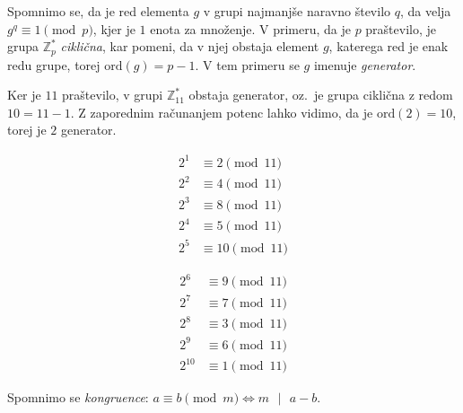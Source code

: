 \documentclass[isrm2, tisk]{fmfdelo}
\newcommand{\Z}{\mathbb Z}
\begin{document}
Spomnimo se, da je red elementa $g$ v grupi najmanjše naravno število $q$, da velja $g^q \equiv 1 \pmod p$, 
kjer je $1$ enota za množenje. V primeru, da je $p$ praštevilo, je grupa $\Z_p^*$ \textit{ciklična},
kar pomeni, da v njej obstaja element $g$, katerega red je enak redu grupe, torej $\text{ord}(g) = p - 1$.
V tem primeru se $g$ imenuje \textit{generator}.

\begin{primer}[Grupa $\Z_{11}^*$]
\label{primer:Z11}
Ker je $11$ praštevilo, v grupi $\Z_{11}^*$ obstaja generator, oz.\ je grupa ciklična z redom $10 = 
11 - 1$. Z zaporednim računanjem potenc lahko vidimo, da je $\text{ord}(2) = 10$, torej je $2$ 
generator.

\begin{minipage}{0.45\textwidth}
    \begin{align*}
        2^1 &\equiv 2 \pmod{11} \\
        2^2 &\equiv 4 \pmod{11} \\
        2^3 &\equiv 8 \pmod{11} \\
        2^4 &\equiv 5 \pmod{11} \\
        2^5 &\equiv 10 \pmod{11} 
    \end{align*}
\end{minipage}
\begin{minipage}{0.45\textwidth}
    \begin{align*}
        2^6 &\equiv 9 \pmod{11} \\
        2^7 &\equiv 7 \pmod{11} \\
        2^8 &\equiv 3 \pmod{11} \\
        2^9 &\equiv 6 \pmod{11} \\
        2^{10} &\equiv 1 \pmod{11} 
    \end{align*}
\end{minipage}

\end{primer}

\begin{opomba}
    Spomnimo se \textit{kongruence}: $a \equiv b \pmod m \iff m \text{ }|\text{ } a - b$.
\end{opomba}
\end{document}
